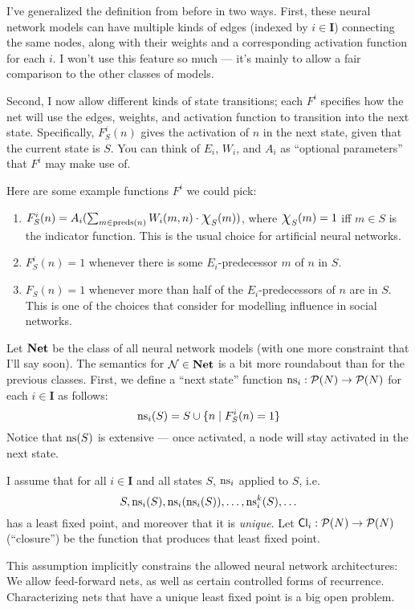 \documentclass[letterpaper]{article}
\begin{document}
I've generalized the definition from before in two ways.  First, these neural network models can have multiple kinds of edges (indexed by $i \in \textbf{I}$) connecting the same nodes, along with their weights and a corresponding activation function for each $i$.  I won't use this feature so much --- it's mainly to allow a fair comparison to the other classes of models.

Second, I now allow different kinds of state transitions; each $F^i$ specifies how the net will use the edges, weights, and activation function to transition into the next state.  Specifically, $F^i_S(n)$ gives the activation of $n$ in the next state, given that the current state is $S$.  You can think of $E_i$, $W_i$, and $A_i$ as ``optional parameters'' that $F^i$ may make use of.

\begin{example*}
    Here are some example functions $F^i$ we could pick:
    \begin{enumerate}
        \item $F^i_S(n) = A_i(\sum_{m \in \mathrm{preds}(n)} W_i(m, n) \cdot \mbox{\Large$\chi$}_S(m))$, where $\mbox{\Large$\chi$}_S(m) = 1$ iff $m \in S$ is the indicator function.  This is the usual choice for artificial neural networks.
        \item $F^i_S(n) = 1$ whenever there is some $E_i$-predecessor $m$ of $n$ in $S$.
        \item $F_S(n) = 1$ whenever more than half of the $E_i$-predecessors of $n$ are in $S$.  This is one of the choices that \cite{baltag2019socialnetworks} consider for modelling influence in social networks.
    \end{enumerate}
\end{example*}

Let $\textrm{\textbf{Net}}$ be the class of all neural network models (with one more constraint that I'll say soon).  The semantics for $\mathcal{N} \in \textrm{\textbf{Net}}$ is a bit more roundabout than for the previous classes.  First, we define a ``next state'' function $\mathrm{ns}_i : \mathcal{P}(N) \to \mathcal{P}(N)$ for each $i \in \textbf{I}$ as follows:
\[
    \mathrm{ns}_i(S) = S \cup \{ n \mid F^i_S(n) = 1 \}
\]
Notice that $\mathrm{ns}(S)$ is extensive --- once activated, a node will stay activated in the next state.

\begin{postulate*}
    I assume that for all $i \in \textbf{I}$ and all states $S$, $\mathrm{ns}_i$ applied to $S$, i.e.
    \[
        S, \mathrm{ns}_i(S), \mathrm{ns}_i(\mathrm{ns}_i(S)), \ldots, \mathrm{ns}^k_i(S), \ldots
    \]
    has a least fixed point, and moreover that it is \emph{unique}.  Let $\mathsf{Cl}_i : \mathcal{P}(N) \to \mathcal{P}(N)$ (``closure'') be the function that produces that least fixed point.
\end{postulate*}
This assumption implicitly constrains the allowed neural network architectures: We allow feed-forward nets, as well as certain controlled forms of recurrence.  Characterizing nets that have a unique least fixed point is a big open problem.
\end{document}
